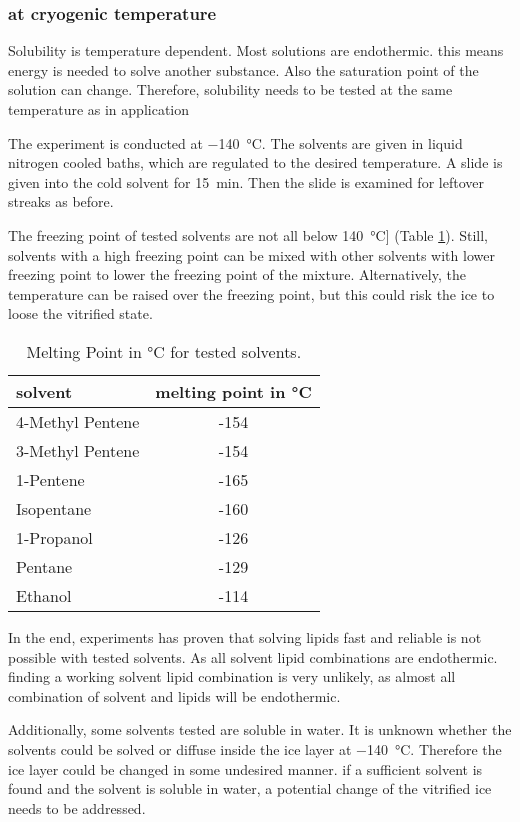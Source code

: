 \subsubsection{at cryogenic temperature}
\label{chapter:meltingtemp}


Solubility is temperature dependent. Most solutions are endothermic. this means energy is needed to solve another substance. Also the saturation point of the solution can change. Therefore, solubility needs to be tested at the same temperature as in application

The experiment is conducted at \SI{-140}{\degreeCelsius}. The solvents are given in liquid nitrogen cooled baths, which are regulated to the desired temperature. A slide is given into the cold solvent for \SI{15}{\minute}. Then the slide is examined for leftover streaks as before.

The freezing point of tested solvents are not all below \SI{140}{\degreeCelsius}] (Table \ref{table:SchmelztemperaturLösungsmittel}). Still, solvents with a high freezing point can be mixed with other solvents with lower freezing point to lower the freezing point of the mixture. Alternatively, the temperature can be raised over the freezing point, but this could risk the ice to loose the vitrified state.

\begin{table}[hbt!]
	\centering
	\begin{tabular}{|l|c|}
		\hline
		solvent & melting point in °C \\
		\hline
		\hline
		4-Methyl Pentene & -154 \\ 
		\hline
		3-Methyl Pentene & -154 \\
		\hline
		1-Pentene & -165 \\
		\hline
		Isopentane & -160 \\
		\hline
		1-Propanol & -126 \\
		\hline
		Pentane & -129 \\
		\hline
		Ethanol & -114 \\
		\hline
	\end{tabular}
	\caption{Melting Point in °C for tested solvents.}
	\label{table:SchmelztemperaturLösungsmittel}
\end{table}

In the end, experiments has proven that solving lipids fast and reliable is not possible with tested solvents. As all solvent lipid combinations are endothermic. finding a working solvent lipid combination is very unlikely, as almost all combination of solvent and lipids will be endothermic.

Additionally, some solvents tested are soluble in water. It is unknown whether the solvents could be solved or diffuse inside the ice layer at \SI{-140}{\degreeCelsius}. Therefore the ice layer could be changed in some undesired manner. if a sufficient solvent is found and the solvent is soluble in water, a potential change of the vitrified ice needs to be addressed.
